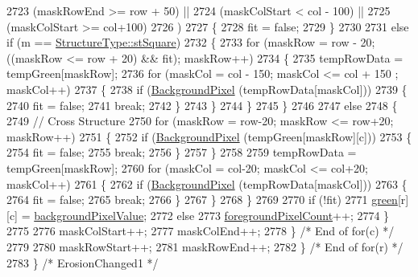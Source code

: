 \begin{DoxyCode}
2723              (maskRowEnd   >= row + 50)  ||  
2724              (maskColStart <  col - 100) ||
2725              (maskColStart >= col+100)
2726             )
2727         \{
2728           fit = \textcolor{keyword}{false};
2729         \}
2730 
2731         \textcolor{keywordflow}{else} \textcolor{keywordflow}{if}  (m == \hyperlink{class_k_k_b_1_1_morph_op_a09e4aff7e81327849855ff72082d85b3a04505973fd476144464695ac6483e490}{StructureType::stSquare})
2732         \{
2733           \textcolor{keywordflow}{for}  (maskRow = row - 20;  ((maskRow <= row + 20)  &&  fit);  maskRow++)
2734           \{
2735             tempRowData =  tempGreen[maskRow];
2736             \textcolor{keywordflow}{for}  (maskCol = col - 150;  maskCol <= col + 150 ; maskCol++)
2737             \{
2738               \textcolor{keywordflow}{if}  (\hyperlink{class_k_k_b_1_1_raster_a0756fb5530274d5e28858d3e1633d595}{BackgroundPixel} (tempRowData[maskCol]))
2739               \{
2740                 fit = \textcolor{keyword}{false};
2741                 \textcolor{keywordflow}{break};
2742               \}
2743             \}
2744           \} 
2745         \}
2746 
2747         \textcolor{keywordflow}{else}
2748         \{
2749           \textcolor{comment}{//  Cross Structure}
2750           \textcolor{keywordflow}{for}  (maskRow = row-20;  maskRow <= row+20;  maskRow++)
2751           \{
2752             \textcolor{keywordflow}{if}  (\hyperlink{class_k_k_b_1_1_raster_a0756fb5530274d5e28858d3e1633d595}{BackgroundPixel} (tempGreen[maskRow][c]))
2753             \{
2754               fit = \textcolor{keyword}{false};
2755               \textcolor{keywordflow}{break};
2756             \}
2757           \}
2758 
2759           tempRowData =  tempGreen[maskRow];
2760           \textcolor{keywordflow}{for}  (maskCol = col-20;  maskCol <= col+20;  maskCol++)
2761           \{
2762             \textcolor{keywordflow}{if}  (\hyperlink{class_k_k_b_1_1_raster_a0756fb5530274d5e28858d3e1633d595}{BackgroundPixel} (tempRowData[maskCol]))
2763             \{
2764               fit = \textcolor{keyword}{false};
2765               \textcolor{keywordflow}{break};
2766             \}
2767           \}
2768         \}
2769 
2770         \textcolor{keywordflow}{if}  (!fit)
2771           \hyperlink{class_k_k_b_1_1_raster_a2d2238911145488e226cd2e34fc8448c}{green}[r][c] = \hyperlink{class_k_k_b_1_1_raster_ab7ed2191cce116a6a37029dc6e3713ef}{backgroundPixelValue};
2772         \textcolor{keywordflow}{else}
2773           \hyperlink{class_k_k_b_1_1_raster_aa7e86253f4b9c347da718732e44b60e8}{foregroundPixelCount}++;
2774       \}
2775 
2776       maskColStart++;
2777       maskColEnd++;
2778     \}   \textcolor{comment}{/* End of for(c) */}
2779 
2780     maskRowStart++;
2781     maskRowEnd++;
2782   \}   \textcolor{comment}{/* End of for(r) */}
2783 \}  \textcolor{comment}{/* ErosionChanged1 */}
\end{DoxyCode}
